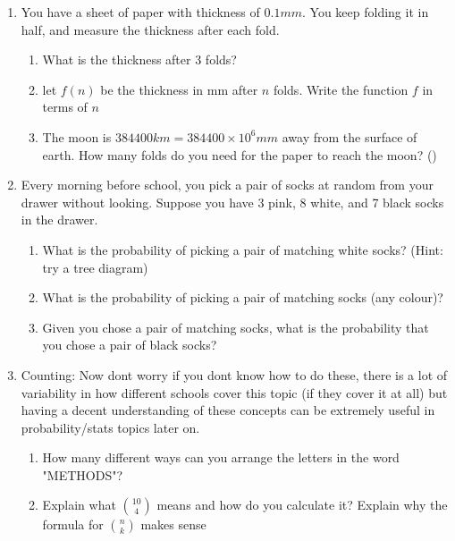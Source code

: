 \documentclass[12pt]{article}
\begin{document}
\begin{enumerate}
    \item You have a sheet of paper with thickness of $0.1mm$. You keep folding it in half, and measure the thickness after each fold.
    \begin{enumerate}
        \item What is the thickness after 3 folds?
        \vspace{2cm}
        \item let $f(n)$ be the thickness in mm after $n$ folds. Write the function $f$ in terms of $n$
        \vspace{3cm}
        \item The moon is $384400 km = 384400 \times 10^{6} mm$ away from the surface of earth. How many folds do you need for the paper to reach the moon? (\faCalculator)
        \vspace{4cm}
    \end{enumerate}

    \item Every morning before school, you pick a pair of socks at random from your drawer without looking. Suppose you have 3 pink, 8 white, and 7 black socks in the drawer.
    \begin{enumerate}
        \item What is the probability of picking a pair of matching white socks? (Hint: try a tree diagram)
        \vspace{3cm}
        \item What is the probability of picking a pair of matching socks (any colour)?
        \vspace{3cm}
        \item Given you chose a pair of matching socks, what is the probability that you chose a pair of black socks?
        \vspace{3cm}
    \end{enumerate}
    \item Counting: Now dont worry if you dont know how to do these, there is a lot of variability in how different schools cover this topic (if they cover it at all) but having a decent understanding of these concepts can be extremely useful in probability/stats topics later on.
    \begin{enumerate}
    \item How many different ways can you arrange the letters in the word "METHODS"? 
    \vspace{3cm}
    \item Explain what ${10 \choose{4}}$ means and how do you calculate it? Explain why the formula for ${n \choose{k}}$ makes sense
    \vspace{3cm}
    
\end{enumerate}
    
\end{enumerate}
\end{document}
